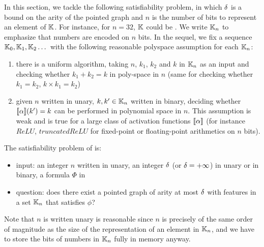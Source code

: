In this section, we tackle the following satisfiability problem, in which $\delta$ is a bound on the arity of the pointed graph and $n$ is the number of bits to represent an element of $\mathbb K$. For instance, for $n = 32$, $\mathbb K$ could be %
. 
We write $\mathbb K_n$ to emphasize that numbers are encoded on $n$ bits. In the sequel, we fix a sequence $\mathbb K_0, \mathbb K_1, \mathbb K_2 \dots$ with the following reasonable polyspace assumption for each $\mathbb K_n$:
\begin{enumerate}
    \item there is a uniform algorithm, taking $n$, $k_1$, $k_2$ and $k$ in $\mathbb K_n$ as an input and checking whether $k_1+k_2=k$ in poly-space in $n$ (same for checking whether $k_1=k_2$, $k\times k_1=k_2$)
    \item given $n$ written in unary, $k, k' \in \mathbb K_n$ written in binary, deciding whether
$[\![\alpha]\!](k') = k$
can be performed in polynomial space in $n$. This assumption is weak and is true for a large class of activation functions $[\![\alpha]\!]$ (for instance $ReLU$, $truncatedReLU$ for fixed-point or floating-point arithmetics on $n$ bits).
\end{enumerate}


\begin{definition}
The satisfiability problem of \thelogic{} is:
    \begin{itemize}
        \item input: an integer $n$ written in unary, an integer $\delta$ (or $\delta = +\infty$) in unary or in binary, a formula $\Phi$ in \thelogic{}
        \item question: does there exist a pointed graph of arity at most $\delta$ with features in a set $\mathbb K_n$ that satisfies $\phi$?
    \end{itemize}
\end{definition}

Note that $n$ is written unary is reasonable since $n$ is precisely of the same order of magnitude as the size of the representation of an element in $\mathbb K_n$, and we have to store the bits of numbers in $\mathbb K_n$ fully in memory anyway.


